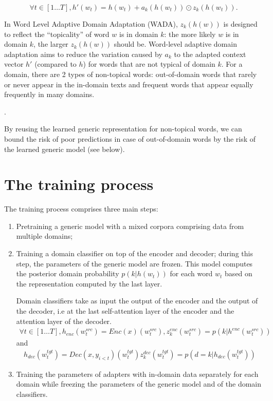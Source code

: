 \documentclass[12pt,times,a4paper,twoside]{article}
\newcommand{\fyTodo}[1]{\Todo[FY:]{\textcolor{orange}{#1}}}
\newcommand{\fyDone}[1]{\done[FY]\Todo[FY:]{\textcolor{orange}{#1}}}
\theoremstyle{definition}
\begin{document}
\begin{equation}
   \forall t \in [1 \dots{} T], h'(w_t) = h(w_t) + a_k(h(w_t)) \odot{} z_k(h(w_t)). \label{eq:gated-residual}
\end{equation}
 
In Word Level Adaptive Domain Adaptation (WADA), $z_k(h(w))$ is designed to reflect the ``topicality'' of  word $w$ is in domain $k$: the more likely $w$ is in domain $k$, the larger $z_k(h(w))$ should be. Word-level adaptive domain adaptation aims to reduce the variation caused by $a_k$ to the adapted context vector $h'$ (compared to $h$) for words that are not typical of domain $k$. For a domain, there are 2 types of non-topical words: out-of-domain words that rarely or never appear in the in-domain texts and frequent words that appear equally frequently in many domains. \fyTodo{This is like a poor Tf-idf - can be because tf is small or because idf is small} 

\fyTodo{Experiment: compute posterior probability of words that have poor $tf-idf$ to verify the gating operation}. 

By reusing the learned generic representation for non-topical words, we can bound the risk of poor predictions in case of out-of-domain words by the risk of the learned generic model (see below).

\section*{The training process}
The training process comprises three main steps:
\begin{enumerate}
\item Pretraining a generic model with a mixed corpora comprising data from multiple domains;
\item Training a domain classifier on top of the encoder and decoder; during this step, the parameters of the generic model are frozen. This model computes the posterior domain probability $p(k|h(w_t))$ for each word $w_t$ based on the representation computed by the last layer.
  
  Domain classifiers take as input the output of the encoder and the output of the decoder, i.e at the last self-attention layer of the encoder and the attention layer of the decoder. \fyDone{Next sentence is a repetition}
  \begin{align}
    \forall t \in [1 \dots T], h_{enc}(w^{src}_t) = Enc(x)(w^{src}_t), z^{enc}_k(w^{src}_t) = p(k| h^{enc}(w^{src}_t))
  \end{align}
  \fyTodo{what are x and y ?}
  and
  \begin{align}
    h_{dec}(w^{tgt}_t)=Dec(x, y_{i<t})(w^{tgt}_t)  z^{dec}_k(w^{tgt}_t) = p(d=k| h_{dec}(w^{tgt}_t))
  \end{align}
  
\item Training the parameters of adapters with in-domain data separately for each domain while freezing the parameters of the generic model and of the domain classifiers.
\end{enumerate}
\end{document}
